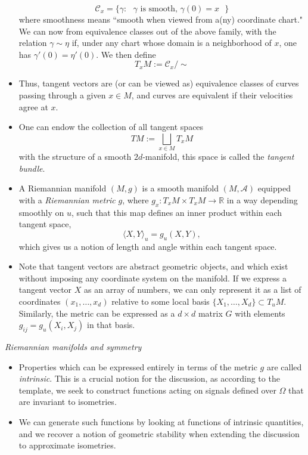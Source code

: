 \documentclass[12pt]{article}
\numberwithin{equation}{section}
\theoremstyle{definition}
\newcommand{		\n		}	{	\noindent					} %
\newcommand{		\1		}	{	\bm{1}					}%
\begin{document}
\begin{itemize}
$$\mathcal{C}_x = \{ \gamma :  \text{ $\gamma$ is smooth, $\gamma(0) =x$ } \}
$$
where smoothness means ``smooth when viewed from a(ny) coordinate chart." We can now from equivalence classes out of the above family, with the relation $\gamma \sim \eta$ if, under any chart whose domain is a neighborhood of $x$, one has $\gamma'(0) = \eta'(0)$. We then define
$$
T_xM := \mathcal{C}_x / \sim 
$$
\item Thus, tangent vectors are (or can be viewed as) equivalence classes of curves passing through a given $x \in M$, and curves are equivalent if their velocities agree at $x$. 
\item One can endow the collection of all tangent spaces
$$
TM := \bigsqcup_{x \in M} T_x M
$$
with the structure of a smooth $2d$-manifold, this space is called the \emph{tangent bundle}.
\item A Riemannian manifold $(M,g)$ is a smooth manifold $(M, \mathcal{A})$ equipped with a \emph{Riemannian metric} $g$, where $g_x : T_xM \times T_xM \to \mathbb{R}$ in a way depending smoothly on $u$, such that this map defines an inner product within each tangent space,
$$
\langle X, Y \rangle_u = g_u(X,Y) ,
$$
which gives us a notion of length and angle within each tangent space. 
\item Note that tangent vectors are abstract geometric objects, and which exist without imposing any coordinate system on the manifold. If we express a tangent vector $X$ as an array of numbers, we can only represent it as a list of coordinates $(x_1, \dots, x_d)$ relative to some local basis $\{ X_1, \dots, X_d\} \subset T_uM$. Similarly, the metric can be expressed as a $d \times d$ matrix $G$ with elements $g_{ij} = g_u(X_i, X_j)$ in that basis. 
\end{itemize}

\n\hrulefill 
\emph{ Riemannian manifolds and symmetry }
\hrulefill

\begin{itemize}
\item Properties which can be expressed entirely in terms of the metric $g$ are called \emph{intrinsic}. This is a crucial notion for the discussion, as according to the template, we seek to construct functions acting on signals defined over $\Omega$ that are invariant to isometries. 
\item We can generate such functions by looking at functions of intrinsic quantities, and we recover a notion of geometric stability when extending the discussion to approximate isometries. 
\end{itemize}
\end{document}
